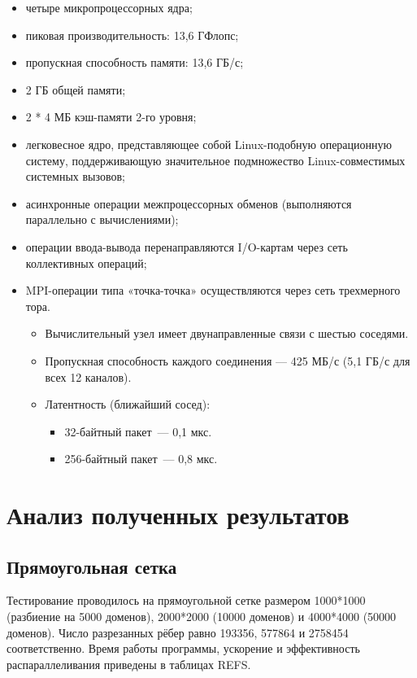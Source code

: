 \documentclass[oneside,final,14pt]{extreport}
\begin{document}
\begin{itemize}
    \item четыре микропроцессорных ядра;
    \item пиковая производительность: 13,6 ГФлопс;
    \item пропускная способность памяти: 13,6 ГБ/с;
    \item 2 ГБ общей памяти;
    \item 2 * 4 МБ кэш-памяти 2-го уровня;
    \item легковесное ядро, представляющее собой Linux-подобную операционную систему,
        поддерживающую значительное подмножество Linux-совместимых системных вызовов;
    \item асинхронные операции межпроцессорных обменов (выполняются параллельно с вычислениями);
    \item операции ввода-вывода перенаправляются I/O-картам через сеть коллективных операций;
    \item MPI-операции типа «точка-точка» осуществляются через сеть трехмерного тора.
        \begin{itemize}
            \item Вычислительный узел имеет двунаправленные связи с шестью соседями.
            \item Пропускная способность каждого соединения — 425 МБ/с (5,1 ГБ/с для всех 12
        каналов).
            \item Латентность (ближайший сосед):
                \begin{itemize}
                    \item 32-байтный пакет~--- 0,1 мкс.
                    \item 256-байтный пакет~--- 0,8 мкс.
                \end{itemize}
        \end{itemize}
\end{itemize}


\chapter*{Анализ полученных результатов}

\section*{Прямоугольная сетка}

Тестирование проводилось на прямоугольной сетке размером
1000*1000 (разбиение на 5000 доменов), 2000*2000 (10000 доменов) и
4000*4000 (50000 доменов). Число разрезанных рёбер равно 193356, 577864 и
2758454 соответственно. Время работы программы, ускорение и эффективность
распараллеливания приведены в таблицах REFS.
\end{document}
